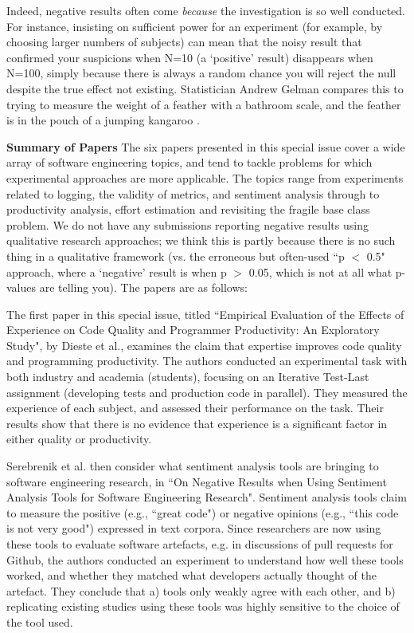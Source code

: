 \documentclass{svjour3}                     %
\begin{document}
Indeed, negative results often come \emph{because} the investigation is so well conducted. For instance, insisting on sufficient power for an experiment (for example, by choosing larger numbers of subjects) can mean that the noisy result that confirmed your suspicions when N=10 (a `positive' result) disappears when N=100, simply because there is always a random chance you will reject the null despite the true effect not existing. Statistician Andrew Gelman compares this to trying to measure the weight of a feather with a bathroom scale, and the feather is in the pouch of a jumping kangaroo \cite{gelman}.

\noindent\textbf{Summary of Papers} The six papers presented in this special issue cover a wide array of software engineering topics, and tend to tackle problems for which experimental approaches are more applicable. The topics range from experiments related to logging, the validity of metrics, and sentiment analysis through to productivity analysis, effort estimation and revisiting the fragile base class problem. We do not have any submissions reporting negative results using qualitative research approaches; we think this is partly because there is no such thing in a qualitative framework (vs. the erroneous but often-used ``p $<$ 0.5" approach, where a `negative' result is when p $>$ 0.05, which is not at all what p-values are telling you). The papers are as follows:

The first paper in this special issue, titled
``Empirical Evaluation of the Effects of Experience on Code Quality and Programmer Productivity: An Exploratory Study", by Dieste et al., examines the claim that expertise improves code quality and programming productivity. The authors conducted  an experimental task with both industry and academia (students), focusing on an Iterative Test-Last assignment (developing tests and production code in parallel). They measured the experience of each subject, and assessed their performance on the task. Their results show that there is no evidence that experience is a significant factor in either quality or productivity.

Serebrenik et al. then consider what sentiment analysis tools are bringing to software engineering research, in ``On Negative Results when Using Sentiment Analysis Tools for Software Engineering Research". Sentiment analysis tools claim to measure the positive (e.g., ``great code") or negative opinions (e.g., ``this code is not very good") expressed in text corpora. Since researchers are now using these tools to evaluate software artefacts, e.g. in discussions of pull requests for Github, the authors conducted an experiment to understand how well these tools worked, and whether they matched what developers actually thought of the artefact. They conclude that a) tools only weakly agree with each other, and b) replicating existing studies using these tools was highly sensitive to the choice of the tool used.
\end{document}
